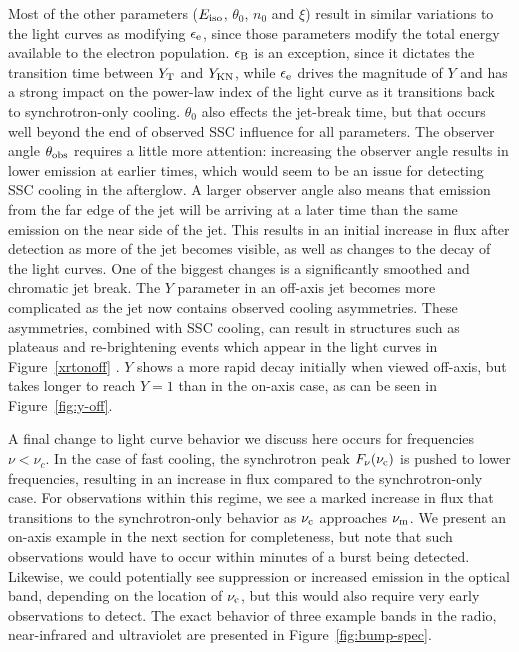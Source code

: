 \documentclass[fleqn,usenatbib]{mnras}
\begin{document}
Most of the other parameters ($E_{\rm iso}$, $\theta_0$, $n_0$ and $\xi$) result in similar variations to the light curves as modifying $\epsilon_{\rm e}$, since those parameters modify the total energy available to the electron population. $\epsilon_{\rm B}$ is an exception, since it dictates the transition time between $Y_{\rm T}$ and $Y_{\rm KN}$, while $\epsilon_{\rm e}$ drives the magnitude of $Y$ and has a strong impact on the power-law index of the light curve as it transitions back to synchrotron-only cooling. $\theta_{0}$ also effects the jet-break time, but that occurs well beyond the end of observed SSC influence for all parameters. The observer angle $\theta_{\rm obs}$ requires a little more attention: increasing the observer angle results in lower emission at earlier times, which would seem to be an issue for detecting SSC cooling in the afterglow. A larger observer angle also means that emission from the far edge of the jet will be arriving at a later time than the same emission on the near side of the jet. This results in an initial increase in flux after detection as more of the jet becomes visible, as well as changes to the decay of the light curves. One of the biggest changes is a significantly smoothed and chromatic jet break. The $Y$ parameter in an off-axis jet becomes more complicated as the jet now contains observed cooling asymmetries. These asymmetries, combined with SSC cooling, can result in structures such as plateaus and re-brightening events which appear in the light curves in Figure~\ref{xrtonoff} \citep[see also e.g.][]{benpl1,benpl2}. $Y$ shows a more rapid decay initially when viewed off-axis, but takes longer to reach $Y=1$ than in the on-axis case, as can be seen in Figure~\ref{fig:y-off}.

A final change to light curve behavior we discuss here occurs for frequencies $\nu < \nu_{c}$. In the case of fast cooling, the synchrotron peak $F_{\nu}(\nu_{\rm c})$ is pushed to lower frequencies, resulting in an increase in flux compared to the synchrotron-only case. For observations within this regime, we see a marked increase in flux that transitions to the synchrotron-only behavior as $\nu_{\rm c}$ approaches $\nu_{\rm m}$. We present an on-axis example in the next section for completeness, but note that such observations would have to occur within minutes of a burst being detected. Likewise, we could potentially see suppression or increased emission in the optical band, depending on the location of $\nu_{\rm c}$, but this would also require very early observations to detect. The exact behavior of three example bands in the radio, near-infrared and ultraviolet are presented in Figure~\ref{fig:bump-spec}.
\end{document}
